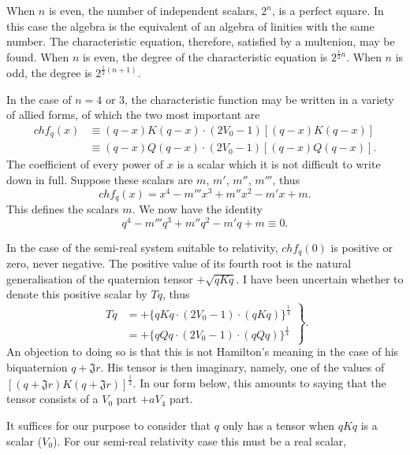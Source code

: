 \documentclass[11pt]{article}
\begin{document}
\indent When $n$ is even, the number of independent scalars, $2^n$, is a perfect square. In this case the algebra is the equivalent of an algebra of linities with the same number. The characteristic equation, therefore, satisfied by a multenion, may be found. When $n$ is even, the degree of the characteristic equation is $2^{\frac12n}$. When $n$ is odd, the degree is $2^{\frac12(n+1)}$.

\indent In the case of $n=4$ or $3$, the characteristic function may be written in a variety of allied forms, of which the two most important are
\begin{align}chf_q(x)&\equiv(q-x)K(q-x)\cdot(2V_0-1)[(q-x)K(q-x)]\tag{1}\\&\equiv(q-x)Q(q-x)\cdot(2V_0-1)[(q-x)Q(q-x)].\tag{2}\end{align}
The coefficient of every power of $x$ is a scalar which it is not difficult to write down in full. Suppose these scalars are $m$, $m'$, $m''$, $m'''$, thus
\begin{equation}chf_q(x)=x^4-m'''x^3+m''x^2-m'x+m.\tag{3}\end{equation}
This defines the scalars $m$. We now have the identity
\begin{equation}q^4-m'''q^3+m''q^2-m'q+m\equiv0.\tag{4}\end{equation}

\indent In the case of the semi-real system suitable to relativity, $chf_q(0)$ is positive or zero, never negative. The positive value of its fourth root is the natural generalisation of the quaternion tensor $+\sqrt{qKq}$. I have been uncertain whether to denote this positive scalar by $Tq$, thus
\begin{equation}\left.\begin{aligned}Tq&=+\{qKq\cdot(2V_0-1)\cdot(qKq)\}^{\frac14}\\&=+\{qQq\cdot(2V_0-1)\cdot(qQq)\}^{\frac14}\end{aligned}\right\}.\tag{5}\end{equation}
An objection to doing so is that this is not Hamilton's meaning in the case of his biquaternion $q+\mathfrak Jr$. His tensor is then imaginary, namely, one of the values of $[(q+\mathfrak Jr)K(q+\mathfrak Jr)]^{\frac12}$. In our form below, this amounts to saying that the tensor consists of a $V_0$ part $+aV_4$ part.

\indent It suffices for our purpose to consider that $q$ only has a tensor when $qKq$ is a scalar ($V_0$). For our semi-real relativity case this must be a real scalar,
\end{document}
